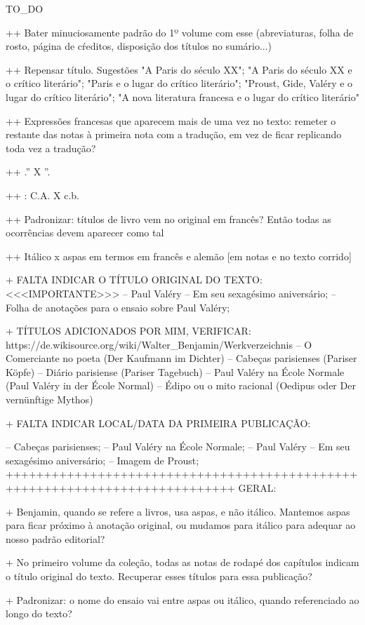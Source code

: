 TO_DO

++ Bater minuciosamente padrão do 1º volume com esse (abreviaturas, folha de rosto, página de cŕeditos, disposição dos títulos no sumário...)

++ Repensar título. Sugestões "A Paris do século XX"; "A Paris do século XX e o crítico literário"; "Paris e o lugar do crítico literário"; "Proust, Gide, Valéry e o lugar do crítico literário"; "A nova literatura francesa e o lugar do crítico literário"

++ Expressões francesas que aparecem mais de uma vez no texto: remeter o restante das notas à primeira nota com a tradução, em vez de ficar replicando toda vez a tradução?

++ .'' X ''.

++ : C.A. X c.b.

++ Padronizar: títulos de livro vem no original em francês? Então todas as ocorrências devem aparecer como tal

++ Itálico x aspas em termos em francês e alemão [em notas e no texto corrido]

+ FALTA INDICAR O TÍTULO ORIGINAL DO TEXTO: <<<IMPORTANTE>>>
-- Paul Valéry – Em seu sexagésimo aniversário;
-- Folha de anotações para o ensaio sobre Paul Valéry;

+ TÍTULOS ADICIONADOS POR MIM, VERIFICAR:
https://de.wikisource.org/wiki/Walter_Benjamin/Werkverzeichnis
-- O Comerciante no poeta (Der Kaufmann im Dichter)
-- Cabeças parisienses (Pariser Köpfe)
-- Diário parisiense (Pariser Tagebuch)
-- Paul Valéry na École Normale (Paul Valéry in der École Normal)
-- Édipo ou o mito racional (Oedipus oder Der vernünftige Mythos)

+ FALTA INDICAR LOCAL/DATA DA PRIMEIRA PUBLICAÇÃO:

-- Cabeças parisienses; 
-- Paul Valéry na École Normale;
-- Paul Valéry – Em seu sexagésimo aniversário;
-- Imagem de Proust; 
++++++++++++++++++++++++++++++++++++++++++++++++++++++++++++++++++++++++++++
GERAL:

+ Benjamin, quando se refere a livros, usa aspas, e não itálico. Mantemos aspas para ficar próximo à anotação original, ou mudamos para itálico para adequar ao nosso padrão editorial?

+ No primeiro volume da coleção, todas as notas de rodapé dos capítulos indicam o título original do texto. Recuperar esses títulos para essa publicação?

+ Padronizar: o nome do ensaio vai entre aspas ou itálico, quando referenciado ao longo do texto?

